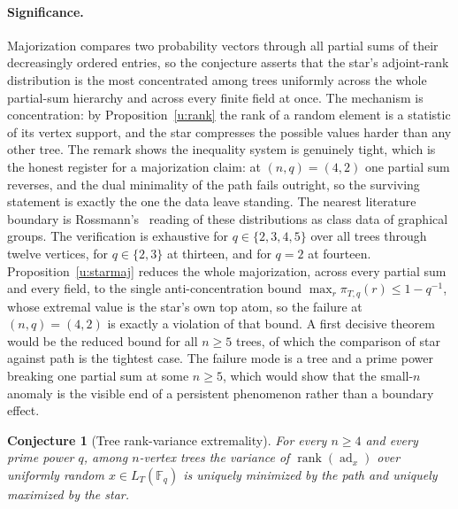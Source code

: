 \documentclass[11pt]{article}
\newtheorem{conjecture}{Conjecture}
\theoremstyle{definition}
\newcommand{\rank}{\operatorname{rank}}
\newcommand{\Fq}{\mathbb F}
\begin{document}
\paragraph{Significance.}
Majorization compares two probability vectors through all partial sums of their decreasingly ordered entries, so the conjecture asserts that the star's adjoint-rank distribution is the most concentrated among trees uniformly across the whole partial-sum hierarchy and across every finite field at once.  The mechanism is concentration: by Proposition~\ref{u:rank} the rank of a random element is a statistic of its vertex support, and the star compresses the possible values harder than any other tree.  The remark shows the inequality system is genuinely tight, which is the honest register for a majorization claim: at $(n,q)=(4,2)$ one partial sum reverses, and the dual minimality of the path fails outright, so the surviving statement is exactly the one the data leave standing.  The nearest literature boundary is Rossmann's~\cite{Ros22} reading of these distributions as class data of graphical groups.  The verification is exhaustive for $q\in\{2,3,4,5\}$ over all trees through twelve vertices, for $q\in\{2,3\}$ at thirteen, and for $q=2$ at fourteen.  Proposition~\ref{u:starmaj} reduces the whole majorization, across every partial sum and every field, to the single anti-concentration bound $\max_r\pi_{T,q}(r)\le1-q^{-1}$, whose extremal value is the star's own top atom, so the failure at $(n,q)=(4,2)$ is exactly a violation of that bound.  A first decisive theorem would be the reduced bound for all $n\ge5$ trees, of which the comparison of star against path is the tightest case.  The failure mode is a tree and a prime power breaking one partial sum at some $n\ge5$, which would show that the small-$n$ anomaly is the visible end of a persistent phenomenon rather than a boundary effect.


\begin{conjecture}[Tree rank-variance extremality]\label{u18}
For every $n\ge4$ and every prime power $q$, among $n$-vertex trees the variance of $\rank(\operatorname{ad}_x)$ over uniformly random $x\in L_T(\Fq_q)$ is uniquely minimized by the path and uniquely maximized by the star.
\end{conjecture}
\end{document}
